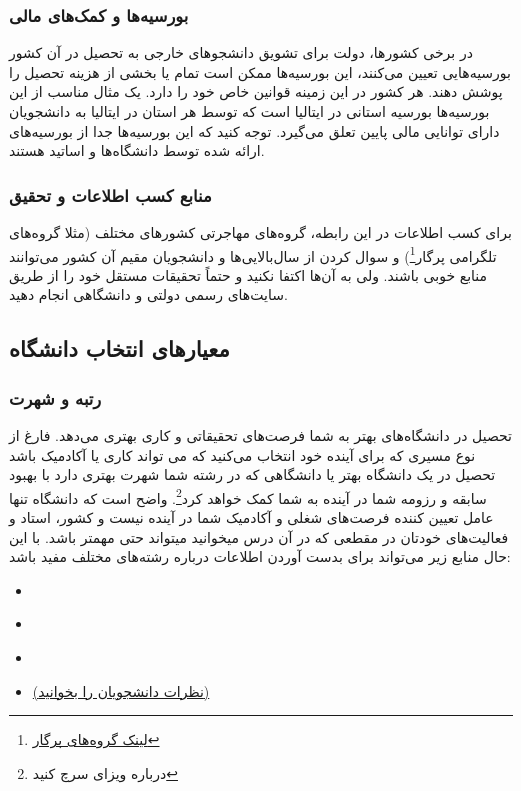 \subsubsection{بورسیه‌ها و کمک‌های مالی}
در برخی کشور‌ها، دولت برای تشویق دانشجوهای خارجی به تحصیل در آن کشور بورسیه‌هایی تعیین می‌کنند، این بورسیه‌ها ممکن است 
تمام یا بخشی از هزینه تحصیل را پوشش دهند. هر کشور در این زمینه قوانین خاص خود را دارد. یک مثال مناسب از این بورسیه‌ها بورسیه استانی در 
ایتالیا است که توسط هر استان در ایتالیا به دانشجویان دارای توانایی مالی پایین تعلق می‌گیرد. توجه کنید که این بورسیه‌ها جدا از بورسیه‌های ارائه  
شده توسط دانشگاه‌ها و اساتید هستند. 

\subsubsection{منابع کسب اطلاعات و تحقیق}
برای کسب اطلاعات در این رابطه، گروه‌های مهاجرتی کشور‌های مختلف 
(مثلا گروه‌های تلگرامی پرگار\footnote{\href{https://t.me/pargarGlinks}{لینک گروه‌های پرگار}}) 
و سوال کردن از سال‌بالایی‌ها و دانشجویان مقیم آن کشور می‌توانند منابع خوبی باشند.
ولی به آن‌ها اکتفا نکنید و حتماً تحقیقات مستقل خود را از طریق سایت‌های رسمی دولتی و دانشگاهی انجام دهید.



\subsection{معیارهای انتخاب دانشگاه}

\subsubsection{رتبه و شهرت}
تحصیل در دانشگاه‌های بهتر به شما فرصت‌های تحقیقاتی و کاری بهتری می‌دهد. فارغ از نوع مسیری که برای آینده خود انتخاب می‌کنید که می تواند کاری یا آکادمیک باشد 
تحصیل در یک دانشگاه بهتر یا دانشگاهی که در رشته شما شهرت بهتری دارد با بهبود سابقه و رزومه شما در آینده به شما کمک خواهد کرد\footnote{درباره ویزای  سرچ کنید}. واضح است که دانشگاه تنها
عامل تعیین کننده فرصت‌های شغلی و آکادمیک‌ شما در آینده نیست و کشور، استاد و فعالیت‌های خودتان در مقطعی که در آن درس میخوانید میتواند حتی مهمتر باشد. 
با این حال منابع زیر می‌تواند برای بدست آوردن اطلاعات درباره رشته‌های مختلف مفید باشد:

\begin{itemize}[leftmargin=1.5cm]
  \item \href{https://www.topuniversities.com/university-rankings}{}
  \item \href{https://www.timeshighereducation.com/world-university-rankings}{} 
  \item \href{https://www.shanghairanking.com/}{}
  \item \href{https://reddit.com}{ (نظرات دانشجویان را بخوانید)}
\end{itemize}


